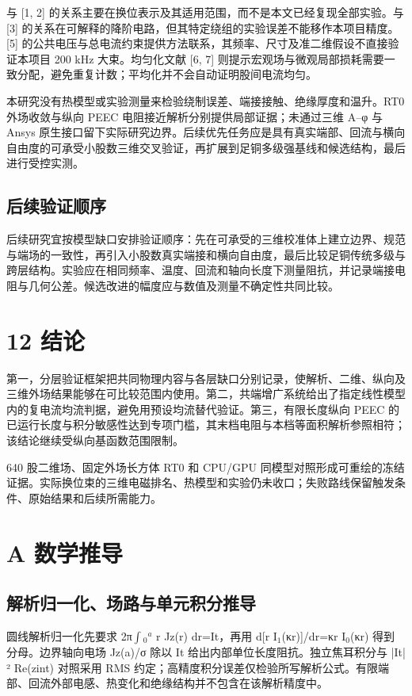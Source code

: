 \documentclass[11pt]{article}
\begin{document}
与 [1, 2] 的关系主要在换位表示及其适用范围，而不是本文已经复现全部实验。与 [3] 的关系在可解释的降阶电路，但其特定绕组的实验误差不能移作本项目精度。[5] 的公共电压与总电流约束提供方法联系，其频率、尺寸及准二维假设不直接验证本项目 200 kHz 大束。均匀化文献 [6, 7] 则提示宏观场与微观局部损耗需要一致分配，避免重复计数；平均化并不会自动证明股间电流均匀。


本研究没有热模型或实验测量来检验绕制误差、端接接触、绝缘厚度和温升。RT0 外场收敛与纵向 PEEC 电阻接近解析分别提供局部证据；未通过三维 A–φ 与 Ansys 原生接口留下实际研究边界。后续优先任务应是具有真实端部、回流与横向自由度的可承受小股数三维交叉验证，再扩展到足铜多级强基线和候选结构，最后进行受控实测。


\subsection*{后续验证顺序}
\hypertarget{11.recommendations.heading}{}
后续研究宜按模型缺口安排验证顺序：先在可承受的三维校准体上建立边界、规范与端场的一致性，再引入小股数真实端接和横向自由度，最后比较足铜传统多级与跨层结构。实验应在相同频率、温度、回流和轴向长度下测量阻抗，并记录端接电阻与几何公差。候选改进的幅度应与数值及测量不确定性共同比较。


\FloatBarrier
\section*{12 结论}
\hypertarget{chapter-12}{}
第一，分层验证框架把共同物理内容与各层缺口分别记录，使解析、二维、纵向及三维外场结果能够在可比较范围内使用。第二，共端增广系统给出了指定线性模型内的复电流均流判据，避免用预设均流替代验证。第三，有限长度纵向 PEEC 的已运行长度与积分敏感性达到专项门槛，其末档电阻与本档等面积解析参照相符；该结论继续受纵向基函数范围限制。


640 股二维场、固定外场长方体 RT0 和 CPU/GPU 同模型对照形成可重绘的冻结证据。实际换位束的三维电磁排名、热模型和实验仍未收口；失败路线保留触发条件、原始结果和后续所需能力。


\FloatBarrier
\section*{A 数学推导}
\hypertarget{chapter-A}{}
\subsection*{解析归一化、场路与单元积分推导}
\hypertarget{A.report_derivation.heading}{}
圆线解析归一化先要求 2π\(\int\)\(_0\)\(^a\) r Jz(r) dr=It，再用 d[r I\(_1\)(κr)]/dr=κr I\(_0\)(κr) 得到分母。边界轴向电场 Jz(a)/σ 除以 It 给出内部单位长度阻抗。独立焦耳积分与 |It|² Re(zint) 对照采用 RMS 约定；高精度积分误差仅检验所写解析公式。有限端部、回流外部电感、热变化和绝缘结构并不包含在该解析精度中。
\end{document}
